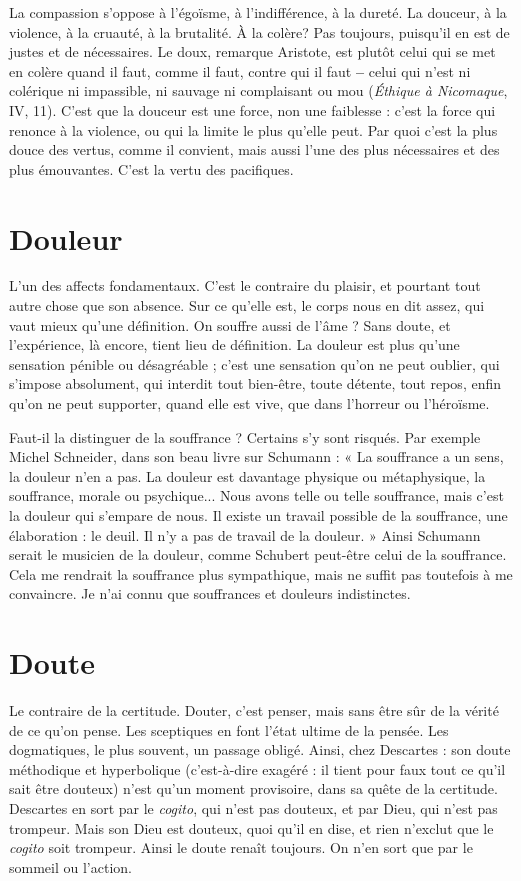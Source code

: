 La compassion s'oppose à l’égoïsme, à l'indifférence, à la dureté. La douceur,
à la violence, à la cruauté, à la brutalité. À la colère? Pas toujours,
puisqu'il en est de justes et de nécessaires. Le doux, remarque Aristote, est
plutôt celui qui se met en colère quand il faut, comme il faut, contre qui il faut
{\bf --} celui qui n’est ni colérique ni impassible, ni sauvage ni complaisant ou mou
({\it Éthique à Nicomaque}, IV, 11). C’est que la douceur est une force, non une
faiblesse : c’est la force qui renonce à la violence, ou qui la limite le plus qu’elle
peut. Par quoi c’est la plus douce des vertus, comme il convient, mais aussi
l'une des plus nécessaires et des plus émouvantes. C’est la vertu des pacifiques.

\section{Douleur}
L'un des affects fondamentaux. C’est le contraire du plaisir, et
pourtant tout autre chose que son absence. Sur ce qu’elle est, le
corps nous en dit assez, qui vaut mieux qu’une définition. On souffre aussi de
l’âme ? Sans doute, et l’expérience, là encore, tient lieu de définition. La douleur
est plus qu’une sensation pénible ou désagréable ; c’est une sensation
qu’on ne peut oublier, qui s'impose absolument, qui interdit tout bien-être,
toute détente, tout repos, enfin qu’on ne peut supporter, quand elle est vive,
que dans l’horreur ou l’héroïsme.

Faut-il la distinguer de la souffrance ? Certains s’y sont risqués. Par exemple
Michel Schneider, dans son beau livre sur Schumann : « La souffrance a un
sens, la douleur n’en a pas. La douleur est davantage physique ou métaphysique,
la souffrance, morale ou psychique... Nous avons telle ou telle souffrance,
mais c’est la douleur qui s'empare de nous. Il existe un travail possible
de la souffrance, une élaboration : le deuil. Il n’y a pas de travail de la douleur. »
Ainsi Schumann serait le musicien de la douleur, comme Schubert peut-être
celui de la souffrance. Cela me rendrait la souffrance plus sympathique, mais
ne suffit pas toutefois à me convaincre. Je n’ai connu que souffrances et douleurs
indistinctes.

\section{Doute}
Le contraire de la certitude. Douter, c’est penser, mais sans être
sûr de la vérité de ce qu’on pense. Les sceptiques en font l’état
ultime de la pensée. Les dogmatiques, le plus souvent, un passage obligé. Ainsi,
chez Descartes : son doute méthodique et hyperbolique (c’est-à-dire exagéré : il
tient pour faux tout ce qu’il sait être douteux) n’est qu’un moment provisoire,
dans sa quête de la certitude. Descartes en sort par le {\it cogito}, qui n’est pas douteux,
et par Dieu, qui n’est pas trompeur. Mais son Dieu est douteux, quoi
qu'il en dise, et rien n’exclut que le {\it cogito} soit trompeur. Ainsi le doute renaît
toujours. On n’en sort que par le sommeil ou l’action.

